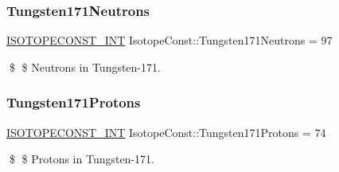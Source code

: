 \subsubsection{\texorpdfstring{Tungsten171\+Neutrons}{Tungsten171Neutrons}}
{\footnotesize\ttfamily \mbox{\hyperlink{group___isotope_const-_macros_ga5f18360b3e99483a35c32d789e62621c}{I\+S\+O\+T\+O\+P\+E\+C\+O\+N\+S\+T\+\_\+\+I\+NT}} Isotope\+Const\+::\+Tungsten171\+Neutrons = 97}

\$ \$ Neutrons in Tungsten-\/171. \mbox{\label{group___isotope_const-_tungsten-_w171_gadb2f0d9260d0e4e30bef461fe55a0ab6}} 
\subsubsection{\texorpdfstring{Tungsten171\+Protons}{Tungsten171Protons}}
{\footnotesize\ttfamily \mbox{\hyperlink{group___isotope_const-_macros_ga5f18360b3e99483a35c32d789e62621c}{I\+S\+O\+T\+O\+P\+E\+C\+O\+N\+S\+T\+\_\+\+I\+NT}} Isotope\+Const\+::\+Tungsten171\+Protons = 74}

\$ \$ Protons in Tungsten-\/171. 